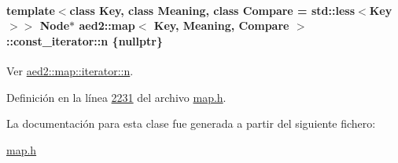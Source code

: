 \paragraph[{\texorpdfstring{n}{n}}]{\setlength{\rightskip}{0pt plus 5cm}template$<$class Key, class Meaning, class Compare = std\+::less$<$\+Key$>$$>$ Node$\ast$ {\bf aed2\+::map}$<$ Key, Meaning, Compare $>$\+::const\+\_\+iterator\+::n \{nullptr\}\hspace{0.3cm}{\ttfamily [private]}}\hypertarget{classaed2_1_1map_1_1const__iterator_a921e123f9c7f94610cf9fee3ab55d277_a921e123f9c7f94610cf9fee3ab55d277}{}\label{classaed2_1_1map_1_1const__iterator_a921e123f9c7f94610cf9fee3ab55d277_a921e123f9c7f94610cf9fee3ab55d277}


Ver \hyperlink{classaed2_1_1map_1_1iterator_adf8633ef71bb6c1fc01c0abe8728fd93_adf8633ef71bb6c1fc01c0abe8728fd93}{aed2\+::map\+::iterator\+::n}. 



Definición en la línea \hyperlink{map_8h_source_l02231}{2231} del archivo \hyperlink{map_8h_source}{map.\+h}.



La documentación para esta clase fue generada a partir del siguiente fichero\+:\begin{DoxyCompactItemize}
\item 
\hyperlink{map_8h}{map.\+h}\end{DoxyCompactItemize}
